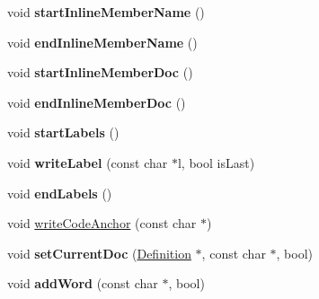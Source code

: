 \begin{DoxyCompactItemize}
\item 
\hypertarget{class_man_generator_a3307ae57ec582f244a790325900c1c96}{void {\bfseries start\-Inline\-Member\-Name} ()}\label{class_man_generator_a3307ae57ec582f244a790325900c1c96}

\item 
\hypertarget{class_man_generator_a41cbfeb50f86a4c1531e2012dbcbb209}{void {\bfseries end\-Inline\-Member\-Name} ()}\label{class_man_generator_a41cbfeb50f86a4c1531e2012dbcbb209}

\item 
\hypertarget{class_man_generator_a2a23f25caeb56aba89bc2b2c4147a2d2}{void {\bfseries start\-Inline\-Member\-Doc} ()}\label{class_man_generator_a2a23f25caeb56aba89bc2b2c4147a2d2}

\item 
\hypertarget{class_man_generator_a7a50d2a68d8d8805c86482012f422cba}{void {\bfseries end\-Inline\-Member\-Doc} ()}\label{class_man_generator_a7a50d2a68d8d8805c86482012f422cba}

\item 
\hypertarget{class_man_generator_aa1c00a079e425e24bbbb9291a698cbf2}{void {\bfseries start\-Labels} ()}\label{class_man_generator_aa1c00a079e425e24bbbb9291a698cbf2}

\item 
\hypertarget{class_man_generator_a4877c6f161162a399bf051570dee0c4a}{void {\bfseries write\-Label} (const char $\ast$l, bool is\-Last)}\label{class_man_generator_a4877c6f161162a399bf051570dee0c4a}

\item 
\hypertarget{class_man_generator_a26e386d6fcaae518c16e018bee486a61}{void {\bfseries end\-Labels} ()}\label{class_man_generator_a26e386d6fcaae518c16e018bee486a61}

\item 
void \hyperlink{class_man_generator_a688757a1dcb8c6bef1202433a36083a7}{write\-Code\-Anchor} (const char $\ast$)
\item 
\hypertarget{class_man_generator_a71a2ac1fad218c1ccb067138cdfaae22}{void {\bfseries set\-Current\-Doc} (\hyperlink{class_definition}{Definition} $\ast$, const char $\ast$, bool)}\label{class_man_generator_a71a2ac1fad218c1ccb067138cdfaae22}

\item 
\hypertarget{class_man_generator_a1243ea01d31796d179387017700b7d12}{void {\bfseries add\-Word} (const char $\ast$, bool)}\label{class_man_generator_a1243ea01d31796d179387017700b7d12}

\end{DoxyCompactItemize}
